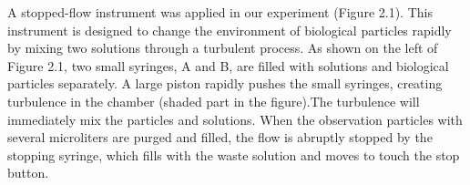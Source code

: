 \documentclass[a4paper,english,12pt,bibliography=totoc]{scrreprt}
\begin{document}








A stopped-flow instrument was applied in our experiment (Figure 2.1). This instrument is designed to change the environment of biological particles rapidly by mixing two solutions through a turbulent process. As shown on the left of Figure 2.1, two small syringes, A and B, are filled with solutions and biological particles separately. A large piston rapidly pushes the small syringes, creating turbulence in the chamber (shaded part in the figure).The turbulence will immediately mix the particles and solutions. When the observation particles with several microliters are purged and filled, the flow is abruptly stopped by the stopping syringe, which fills with the waste solution and moves to touch the stop button. \\
\end{document}
